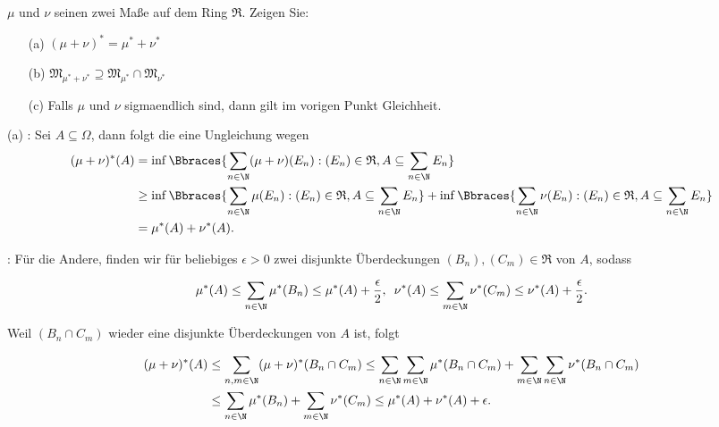 \begin{exercise}

$\mu$ und $\nu$ seinen zwei Maße auf dem Ring $\mathfrak{R}$. Zeigen Sie:

\begin{itemize}
  \item[(a)] $(\mu + \nu)^\ast = \mu^\ast + \nu^\ast$
  \item[(b)] $\mathfrak{M}_{\mu^\ast + \nu^\ast} \supseteq \mathfrak{M}_{\mu^\ast} \cap \mathfrak{M}_{\nu^\ast}$
  \item[(c)] Falls $\mu$ und $\nu$ sigmaendlich sind, dann gilt im vorigen Punkt Gleichheit.
\end{itemize}

\end{exercise}


\begin{solution}

(a) \Quote{$\geq$}: Sei $A \subseteq \Omega$, dann folgt die eine Ungleichung wegen \\

\begin{align*}
  (\mu + \nu)^\ast(A)
  & =
    \inf \Bbraces{\sum_{n \in \N} (\mu + \nu)(E_n): (E_n) \in \mathfrak{R}, A \subseteq \sum_{n \in \N} E_n} \\
  & \geq
    \inf \Bbraces{\sum_{n \in \N} \mu(E_n): (E_n) \in \mathfrak{R}, A \subseteq \sum_{n \in \N} E_n} +
    \inf \Bbraces{\sum_{n \in \N} \nu(E_n): (E_n) \in \mathfrak{R}, A \subseteq \sum_{n \in \N} E_n} \\
  & =
    \mu^\ast(A) + \nu^\ast(A).
\end{align*}

\Quote{$\leq$}: Für die Andere, finden wir für beliebiges $\epsilon > 0$ zwei disjunkte Überdeckungen $(B_n), (C_m) \in \mathfrak{R}$ von $A$, sodass

\begin{align*}
  \mu^\ast(A) \leq \sum_{n \in \N} \mu^\ast(B_n) \leq \mu^\ast(A) + \frac{\epsilon}{2}, \enspace
  \nu^\ast(A) \leq \sum_{m \in \N} \nu^\ast(C_m) \leq \nu^\ast(A) + \frac{\epsilon}{2}.
\end{align*}

Weil $(B_n \cap C_m)$ wieder eine disjunkte Überdeckungen von $A$ ist, folgt

\begin{align*}
  (\mu + \nu)^\ast(A)
  & \leq
    \sum_{n, m \in \N} (\mu + \nu)^\ast(B_n \cap C_m)
    \leq
    \sum_{n \in \N} \sum_{m \in \N} \mu^\ast(B_n \cap C_m) +
    \sum_{m \in \N} \sum_{n \in \N} \nu^\ast(B_n \cap C_m) \\
  & \leq
    \sum_{n \in \N} \mu^\ast(B_n) +
    \sum_{m \in \N} \nu^\ast(C_m)
    \leq
    \mu^\ast(A) + \nu^\ast(A) + \epsilon.
\end{align*}

\end{solution}
